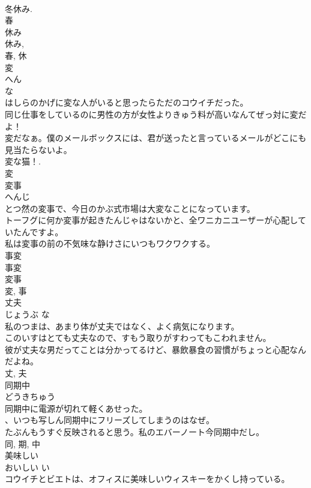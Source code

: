 \documentclass[8pt]{extreport}
\begin{document}
\begin{CJK}{UTF8}{min}
\\	冬休み. 
\\	春 
\\	休み 
\\	休み, 
\\	春, 休	
\\	変	
\\	へん	
\\	な 
\\	はしらのかげに変な人がいると思ったらただのコウイチだった。	
\\	同じ仕事をしているのに男性の方が女性よりきゅう料が高いなんてぜっ対に変だよ！	
\\	変だなぁ。僕のメールボックスには、君が送ったと言っているメールがどこにも見当たらないよ。	
\\	変な猫！.
\\	変	
\\	変事	
\\	へんじ	
\\	とつ然の変事で、今日のかぶ式市場は大変なことになっています。	
\\	トーフグに何か変事が起きたんじゃはないかと、全ワニカニユーザーが心配していたんですよ。	
\\	私は変事の前の不気味な静けさにいつもワクワクする。	
\\	事変 
\\	事変 
\\	変事 
\\	変, 事	
\\	丈夫	
\\	じょうぶ	な 
\\	私のつまは、あまり体が丈夫ではなく、よく病気になります。	
\\	このいすはとても丈夫なので、すもう取りがすわってもこわれません。	
\\	彼が丈夫な男だってことは分かってるけど、暴飲暴食の習慣がちょっと心配なんだよね。	
\\	丈, 夫	
\\	同期中	
\\	どうきちゅう	
\\	同期中に電源が切れて軽くあせった。	
\\	、いつも写しん同期中にフリーズしてしまうのはなぜ。	
\\	たぶんもうすぐ反映されると思う。私のエバーノート今同期中だし。	
\\	同, 期, 中	
\\	美味しい	
\\	おいしい	い 
\\	コウイチとビエトは、オフィスに美味しいウィスキーをかくし持っている。	

\end{CJK}
\end{document}
